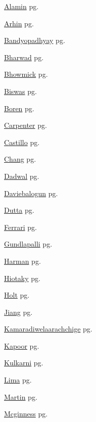 \item \hyperlink{Alamin.1}{Alamin} pg. \pageref{abs:Alamin}
\item \hyperlink{Arhin.1}{Arhin} pg. \pageref{abs:Arhin}
\item \hyperlink{Bandyopadhyay.1}{Bandyopadhyay} pg. \pageref{abs:Bandyopadhyay}
\item \hyperlink{Bharwad.1}{Bharwad} pg. \pageref{abs:Bharwad}
\item \hyperlink{Bhowmick.1}{Bhowmick} pg. \pageref{abs:Bhowmick}
\item \hyperlink{Biswas.1}{Biswas} pg. \pageref{abs:Biswas}
\item \hyperlink{Boren.1}{Boren} pg. \pageref{abs:Boren}
\item \hyperlink{Carpenter.1}{Carpenter} pg. \pageref{abs:Carpenter}
\item \hyperlink{Castillo.1}{Castillo} pg. \pageref{abs:Castillo}
\item \hyperlink{Chang.1}{Chang} pg. \pageref{abs:Chang}
\item \hyperlink{Dadwal.1}{Dadwal} pg. \pageref{abs:Dadwal}
\item \hyperlink{Daviebalogun.1}{Daviebalogun} pg. \pageref{abs:Daviebalogun}
\item \hyperlink{Dutta.1}{Dutta} pg. \pageref{abs:Dutta}
\item \hyperlink{Ferrari.1}{Ferrari} pg. \pageref{abs:Ferrari}
\item \hyperlink{Gundlapalli.1}{Gundlapalli} pg. \pageref{abs:Gundlapalli}
\item \hyperlink{Harman.1}{Harman} pg. \pageref{abs:Harman}
\item \hyperlink{Hiotaky.1}{Hiotaky} pg. \pageref{abs:Hiotaky}
\item \hyperlink{Holt.1}{Holt} pg. \pageref{abs:Holt}
\item \hyperlink{Jiang.1}{Jiang} pg. \pageref{abs:Jiang}
\item \hyperlink{Kamaradiwelaarachchige.1}{Kamaradiwelaarachchige} pg. \pageref{abs:Kamaradiwelaarachchige}
\item \hyperlink{Kapoor.1}{Kapoor} pg. \pageref{abs:Kapoor}
\item \hyperlink{Kulkarni.1}{Kulkarni} pg. \pageref{abs:Kulkarni}
\item \hyperlink{Lima.1}{Lima} pg. \pageref{abs:Lima}
\item \hyperlink{Martin.1}{Martin} pg. \pageref{abs:Martin}
\item \hyperlink{Mcginness.1}{Mcginness} pg. \pageref{abs:Mcginness}

